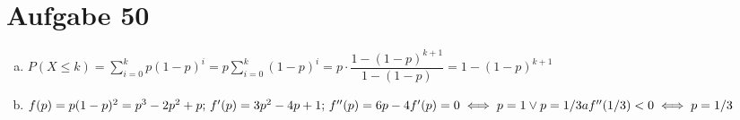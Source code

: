 \section{Aufgabe 50}

\begin{enumerate}[(a)]
    \item $P(X \leq k) = \sum_{i = 0}^kp(1 - p)^i = p\sum_{i = 0}^k(1 - p)^i = p \cdot \dfrac{1 - (1 - p)^{k + 1}}{1 - (1 - p)} = 1 - (1 - p)^{k + 1}$
    \item $f(p) = p(1 - p)^2 = p^3 - 2p^2 + p\text{;  } f'(p) = 3p^2 - 4p + 1\text{;  } f''(p) = 6p - 4 \\[5pt]
            f'(p) = 0 \iff p = 1 \lor p = 1/3a \\[5pt]
            f''(1/3) < 0 \iff p = 1/3$
\end{enumerate}

